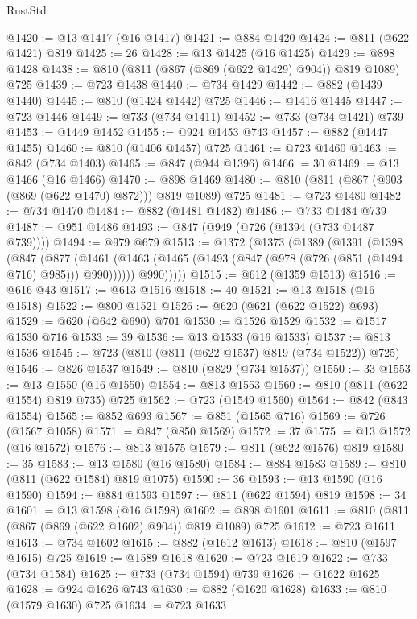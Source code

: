 \begin{lexlean}{RustStd}
\begin{coremodule}
@1420 := @13 @1417 (@16 @1417)
@1421 := @884 @1420
@1424 := @811 (@622 @1421) @819
@1425 := 26
@1428 := @13 @1425 (@16 @1425)
@1429 := @898 @1428
@1438 := @810 (@811 (@867 (@869 (@622 @1429) @904)) @819 @1089) @725
@1439 := @723 @1438
@1440 := @734 @1429
@1442 := @882 (@1439 @1440)
@1445 := @810 (@1424 @1442) @725
@1446 := @1416 @1445
@1447 := @723 @1446
@1449 := @733 (@734 @1411)
@1452 := @733 (@734 @1421) @739
@1453 := @1449 @1452
@1455 := @924 @1453 @743
@1457 := @882 (@1447 @1455)
@1460 := @810 (@1406 @1457) @725
@1461 := @723 @1460
@1463 := @842 (@734 @1403)
@1465 := @847 (@944 @1396)
@1466 := 30
@1469 := @13 @1466 (@16 @1466)
@1470 := @898 @1469
@1480 := @810 (@811 (@867 (@903 (@869 (@622 @1470) @872))) @819 @1089) @725
@1481 := @723 @1480
@1482 := @734 @1470
@1484 := @882 (@1481 @1482)
@1486 := @733 @1484 @739
@1487 := @951 @1486
@1493 := @847 (@949 (@726 (@1394 (@733 @1487 @739))))
@1494 := @979 @679
@1513 := @1372
    (@1373
      (@1389
        (@1391
          (@1398
            (@847
              (@877
                (@1461 (@1463 (@1465 (@1493 (@847 (@978 (@726 (@851 (@1494 @716) @985))) @990))))))
              @990)))))
@1515 := @612 (@1359 @1513)
@1516 := @616 @43
@1517 := @613 @1516
@1518 := 40
@1521 := @13 @1518 (@16 @1518)
@1522 := @800 @1521
@1526 := @620 (@621 (@622 @1522) @693)
@1529 := @620 (@642 @690) @701
@1530 := @1526 @1529
@1532 := @1517 @1530 @716
@1533 := 39
@1536 := @13 @1533 (@16 @1533)
@1537 := @813 @1536
@1545 := @723 (@810 (@811 (@622 @1537) @819 (@734 @1522)) @725)
@1546 := @826 @1537
@1549 := @810 (@829 (@734 @1537))
@1550 := 33
@1553 := @13 @1550 (@16 @1550)
@1554 := @813 @1553
@1560 := @810 (@811 (@622 @1554) @819 @735) @725
@1562 := @723 (@1549 @1560)
@1564 := @842 (@843 @1554)
@1565 := @852 @693
@1567 := @851 (@1565 @716)
@1569 := @726 (@1567 @1058)
@1571 := @847 (@850 @1569)
@1572 := 37
@1575 := @13 @1572 (@16 @1572)
@1576 := @813 @1575
@1579 := @811 (@622 @1576) @819
@1580 := 35
@1583 := @13 @1580 (@16 @1580)
@1584 := @884 @1583
@1589 := @810 (@811 (@622 @1584) @819 @1075)
@1590 := 36
@1593 := @13 @1590 (@16 @1590)
@1594 := @884 @1593
@1597 := @811 (@622 @1594) @819
@1598 := 34
@1601 := @13 @1598 (@16 @1598)
@1602 := @898 @1601
@1611 := @810 (@811 (@867 (@869 (@622 @1602) @904)) @819 @1089) @725
@1612 := @723 @1611
@1613 := @734 @1602
@1615 := @882 (@1612 @1613)
@1618 := @810 (@1597 @1615) @725
@1619 := @1589 @1618
@1620 := @723 @1619
@1622 := @733 (@734 @1584)
@1625 := @733 (@734 @1594) @739
@1626 := @1622 @1625
@1628 := @924 @1626 @743
@1630 := @882 (@1620 @1628)
@1633 := @810 (@1579 @1630) @725
@1634 := @723 @1633

\end{coremodule}
\end{lexlean}

